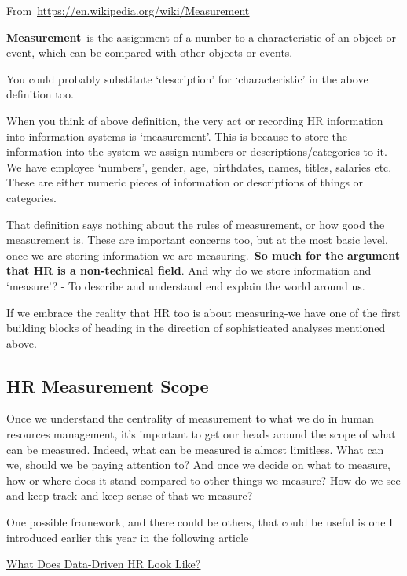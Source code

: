 \documentclass[
]{article}
\begin{document}
From~\href{https://en.wikipedia.org/wiki/Measurement}{\ul{https://en.wikipedia.org/wiki/Measurement}}

\textbf{Measurement}~is the assignment of a number to a characteristic
of an object or event, which can be compared with other objects or
events.

You could probably substitute `description' for `characteristic' in the
above definition too.

When you think of above definition, the very act or recording HR
information into information systems is `measurement'. This is because
to store the information into the system we assign numbers or
descriptions/categories to it. We have employee `numbers', gender, age,
birthdates, names, titles, salaries etc. These are either numeric pieces
of information or descriptions of things or categories.

That definition says nothing about the rules of measurement, or how good
the measurement is. These are important concerns too, but at the most
basic level, once we are storing information we are
measuring.~\textbf{So much for the argument that HR is a non-technical
field}. And why do we store information and `measure'? - To describe and
understand end explain the world around us.

If we embrace the reality that HR too is about measuring-we have one of
the first building blocks of heading in the direction of sophisticated
analyses mentioned above.

\subsection{HR Measurement Scope}\label{hr-measurement-scope}

Once we understand the centrality of measurement to what we do in human
resources management, it's important to get our heads around the scope
of what can be measured. Indeed, what can be measured is almost
limitless. What can we, should we be paying attention to? And once we
decide on what to measure, how or where does it stand compared to other
things we measure? How do we see and keep track and keep sense of that
we measure?

One possible framework, and there could be others, that could be useful
is one I introduced earlier this year in the following article

\href{https://www.linkedin.com/pulse/what-does-data-driven-hr-look-like-lyndon-sundmark-mba?trk=mp-reader-card}{What Does Data-Driven HR Look Like?}
\end{document}
